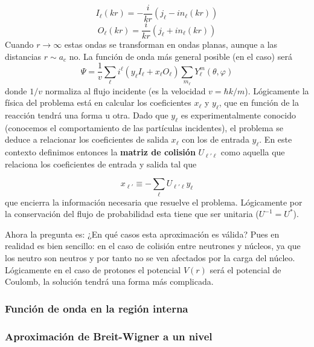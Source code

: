 \documentclass[fleqn,10pt]{SelfArx} %
\newcommand{\parentesis}[1]{\left( #1  \right)}
\begin{document}
\begin{equation}
	I_\ell (kr) = - \frac{i}{kr} \parentesis{j_\ell-in_\ell (kr)}
\end{equation}
\begin{equation}
	O_\ell (kr) = \frac{i}{kr} \parentesis{j_\ell+in_\ell (kr)} 
\end{equation}
Cuando $r\rightarrow\infty$ estas ondas se transforman en ondas planas, aunque a las distancias $r\sim a_c$ no. La función de onda más general posible (en el caso) será
\begin{equation}
	\Psi = \frac{1}{v} \sum_\ell i^\ell ( y_\ell I_\ell + x_\ell O_\ell) \sum_{m_\ell} Y_\ell^m (\theta,\varphi)
\end{equation}
donde $1/v$ normaliza al flujo incidente (es la velocidad $v=\hbar k / m$). Lógicamente la física del problema está en calcular los coeficientes $x_\ell$ y $y_\ell$, que en función de la reacción tendrá una forma u otra. Dado que $y_\ell$ es experimentalmente conocido (conocemos el comportamiento de las partículas incidentes), el problema se deduce a relacionar los coeficientes de salida $x_\ell$ con los de entrada $y_\ell$. En este contexto definimos entonces la \textbf{matriz de colisión} $U_{\ell'\ell}$ como aquella  que relaciona los coeficientes de entrada y salida tal que

\begin{equation}
	x_{\ell'} \equiv - \sum_{\ell} U_{\ell'\ell} y_\ell
\end{equation}
que encierra la información necesaria que resuelve el problema. Lógicamente por la conservación del flujo de probabilidad esta tiene que ser unitaria ($U^{-1}=U^*$).

Ahora la pregunta es: ¿En qué casos esta aproximación es válida? Pues en realidad es bien sencillo: en el caso de colisión entre neutrones y núcleos, ya que los neutro son neutros y por tanto no se ven afectados por la carga del núcleo. Lógicamente en el caso de protones el potencial $V(r)$ será el potencial de Coulomb, la solución tendrá una forma más complicada.





\subsubsection{Función de onda en la región interna}



\subsubsection{Aproximación de Breit-Wigner a un nivel}
\end{document}
